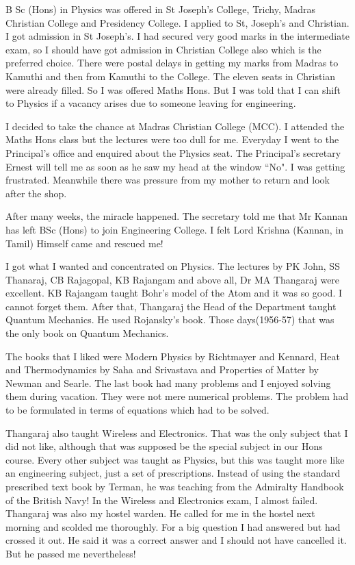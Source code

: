 B Sc (Hons) in Physics was offered in St Joseph's College, Trichy, 
Madras Christian College and Presidency College. I applied to St, 
Joseph's and Christian. I got admission in St Joseph's. I had secured 
very good marks in the intermediate exam, so I should have got admission 
in Christian College also which is the preferred choice.  There were 
postal delays in getting my marks from Madras to Kamuthi and then from 
Kamuthi to the College. The eleven seats in Christian were already 
filled. So I was offered Maths Hons. But I was told that I can shift to 
Physics if a vacancy arises due to someone leaving for engineering.

I decided to take the chance at Madras Christian College (MC\-C). I 
attended the Maths Hons class but the lectures were too dull for me. 
Everyday I went to the Principal's office and enquired about the Physics 
seat. The Principal's secretary Ernest will tell me as soon as he saw my 
head at the window ``No". I was getting frustrated. Meanwhile there was 
pressure from my mother to return and look after the shop.

After many weeks, the miracle happened. The secretary told me that Mr 
Kannan has left BSc (Hons) to join Engineering Co\-llege. I felt Lord 
Krishna (Kannan, in Tamil) Himself came and rescued me!

I got what I wanted and concentrated on Physics. The lectures by PK 
John, SS Thanaraj, CB Rajagopal, KB Rajangam and above all, Dr MA 
Thangaraj were excellent. KB Rajangam taught Bohr's model of the Atom 
and it was so good. I cannot forget them. After that, Thangaraj the Head 
of the Department taught Quantum Mechanics. He used Rojansky's book. 
Those days(1956-57) that was the only book on Quantum Mechanics.

The books that I liked were Modern Physics by Richtmayer and Kennard, 
Heat and Thermodynamics by Saha and Srivastava and Properties of Matter 
by Newman and Searle. The last book had many problems and I enjoyed 
solving them during vacation. They were not mere numerical problems. The 
problem had to be formulated in terms of equations which had to be 
solved.

Thangaraj also taught Wireless and Electronics. That was the only 
subject that I did not like, although that was supposed be the special 
subject in our Hons course. Every other subject was taught as Physics, 
but this was taught more like an enginee\-ring subject, just a set of 
prescriptions. Instead of using the standard prescribed text book by 
Terman, he was teaching from the Admira\-lty Handbook of the British Navy! 
In the Wireless and Electronics exam, I almost failed. Thangaraj was 
also my hostel warden. He called for me in the hostel next morning and 
scolded me thoroughly. For a big question I had answered but had crossed 
it out. He said it was a correct answer and I should not have cancelled 
it. But he passed me nevertheless!

